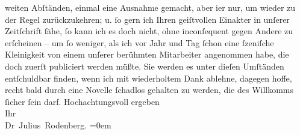 \begin{ledgroupsized}[t]{13cm}
                    weiten Abſtänden, einmal eine Ausnahme gemacht, aber i{\geminationm}er nur, um wieder zu der Regel zurückzukehren; u.
                    ſo gern ich Ihren geiſtvollen Einakter in unſerer Zeitſchrift ſähe, ſo kann ich es doch nicht, ohne
                    inconſequent gegen Andere zu erſcheinen – um ſo weniger, als ich vor Jahr und
                    Tag ſchon eine ſzeniſche Kleinigkeit von einem unſerer berühmten Mitarbeiter
                    angenommen habe, die doch zuerſt publiciert werden müßte. Sie werden es unter
                    dieſen Umſtänden entſchuldbar finden, wenn ich mit wiederholtem Dank ablehne,
                    dagegen hoffe, recht bald durch eine Novelle ſchadlos gehalten zu werden, die
                    des Willkomms ſicher ſein darf.\pend
           \pstart
           Hochachtungsvoll ergeben{\\[\baselineskip]}Ihr{\\[\baselineskip]}\spacefill\mbox{Dr Julius Rodenberg.}\pend
           \leftskip=0em{}\endnumbering{}\end{ledgroupsized}  \newcommand{\dateiname}{L00904}\newcommand{\titel}{Julius Rodenberg an Arthur Schnitzler, 9. 3. 1899}\newcommand{\editorInnen}{Martin Anton Müller und Gerd-Hermann Susen}
      